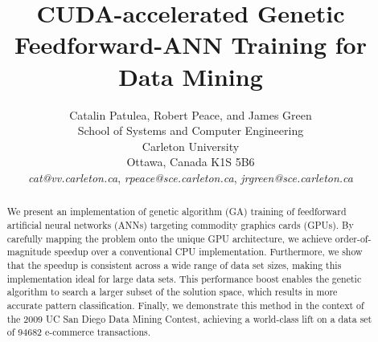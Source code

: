 \documentclass[11pt]{article}       %
\begin{document}


\title{CUDA-accelerated Genetic Feedforward-ANN Training for Data Mining}


\author{
Catalin Patulea, Robert Peace, and James Green\\
School of Systems and Computer Engineering\\
Carleton University\\
Ottawa, Canada K1S 5B6\\
{\em cat@vv.carleton.ca}, {\em rpeace@sce.carleton.ca}, {\em jrgreen@sce.carleton.ca}
} %

\maketitle

\begin{abstract}
We present an implementation of genetic algorithm (GA) training of feedforward artificial neural networks (ANNs) targeting commodity graphics cards (GPUs). By carefully mapping the problem onto the unique GPU architecture, we achieve order-of-magnitude speedup over a conventional CPU implementation. Furthermore, we show that the speedup is consistent across a wide range of data set sizes, making this implementation ideal for large data sets. This performance boost enables the genetic algorithm to search a larger subset of the solution space, which results in more accurate pattern classification. Finally, we demonstrate this method in the context of the 2009 UC San Diego Data Mining Contest, achieving a world-class lift on a data set of 94682 e-commerce transactions.
\end{abstract}

\end{document}
